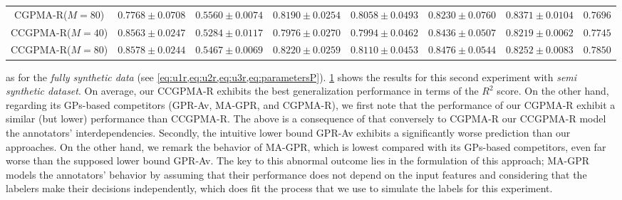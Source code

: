 \documentclass[journal]{IEEEtran}
\begin{document}
\begin{table}[!htb]
{\begin{tabular}{cccccccc}
        CGPMA-R($M=80$) &$0.7768\pm0.0708$ & $0.5560\pm0.0074$ & $0.8190\pm0.0254$ & $0.8058\pm0.0493$ & $0.8230\pm0.0760$ & $0.8371\pm0.0104$ & $0.7696$\\ 
        CCGPMA-R($M=40$)&$0.8563\pm0.0247$ & $0.5284\pm0.0117$ & $0.7976\pm0.0270$ & $0.7994\pm0.0462$ & $0.8436\pm0.0507$ & $0.8219\pm0.0062$ & $0.7745$\\ 
        CCGPMA-R($M=80$)&$\mathbf{0.8578\pm0.0244}$ & $0.5467\pm0.0069$ & $\mathbf{0.8220\pm0.0259}$ & $\mathbf{0.8110\pm0.0453}$ & $\mathbf{0.8476\pm0.0544}$ & $0.8252\pm0.0083$ & $\mathbf{0.7850}$\\\bottomrule
	\end{tabular}}
	\label{tab:SSRegResults}
\end{table}
as for the \textit{fully synthetic data} (see \cref{eq:u1r,eq:u2r,eq:u3r,eq:parametersP}). \cref{tab:SSRegResults} shows the results for this second experiment with \textit{semi synthetic dataset}. On average, our CCGPMA-R  exhibits the best generalization performance in terms of the $R^2$ score. On the other hand, regarding its GPs-based competitors (GPR-Av, MA-GPR, and CGPMA-R), we first note that the performance of our CGPMA-R exhibit a similar (but lower) performance than CCGPMA-R. The above is a consequence of that conversely to CGPMA-R our CCGPMA-R model the annotators' interdependencies. Secondly, the intuitive lower bound GPR-Av exhibits a significantly worse prediction than our approaches. On the other hand, we remark the behavior of MA-GPR, which is lowest compared with its GPs-based competitors, even far worse than the supposed lower bound GPR-Av. The key to this abnormal outcome lies in the formulation of this approach; MA-GPR models the annotators' behavior by assuming that their performance does not depend on the input features and considering that the labelers make their decisions independently, which does fit the process that we use to simulate the labels for this experiment.
\end{document}
